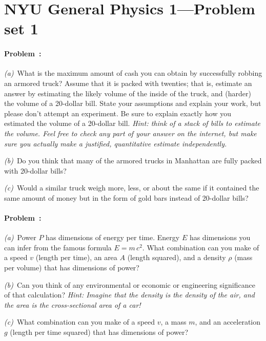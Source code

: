 \documentclass[12pt]{article}
\begin{document}
\thispagestyle{empty}

\section*{NYU General Physics 1---Problem set 1}

\paragraph{Problem~\theproblem:}%
\textsl{(a)}~What is the maximum amount of cash you can obtain by
successfully robbing an armored truck?  Assume that it is packed with
twenties; that is, estimate an answer by estimating the likely volume
of the inside of the truck, and (harder) the volume of a 20-dollar
bill.  State your assumptions and explain your work, but please don't
attempt an experiment.  Be sure to explain exactly how you estimated
the volume of a 20-dollar bill.  \emph{Hint: think of a stack of bills
  to estimate the volume.  Feel free to \emph{check} any part of your
  answer on the internet, but make sure you actually make a justified,
  quantitative estimate independently.}

\textsl{(b)}~Do you think that many of the armored trucks in Manhattan
are fully packed with 20-dollar bills?

\textsl{(c)}~Would a similar truck weigh more, less, or about the same
if it contained the same amount of money but in the form of gold bars
instead of 20-dollar bills?

\paragraph{Problem~\theproblem:}%
\textsl{(a)}~Power $P$ has dimensions of energy per time.  Energy $E$
has dimensions you can infer from the famous formula $E=m\,c^2$.  What
combination can you make of a speed $v$ (length per time), an area $A$
(length squared), and a density $\rho$ (mass per volume) that has
dimensions of power?

\textsl{(b)}~Can you think of any environmental or economic or
engineering significance of that calculation?  \emph{Hint: Imagine
  that the density is the density of the air, and the area is the
  cross-sectional area of a car!}

\textsl{(c)}~What combination can you make of a speed $v$, a mass $m$,
and an acceleration $g$ (length per time squared) that has dimensions
of power?
\end{document}
